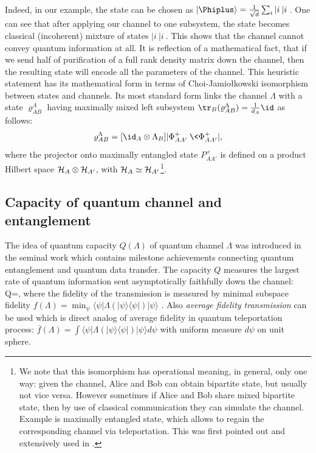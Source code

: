 \documentclass[twocolumn,aps,rmp]{revtex4}
\begin{document}
Indeed, in our example, the state can be chosen as
$|\Phiplus\rangle={1\over \sqrt{d}}\sum_i |i\>|i\>$. One can see
that after applying our channel to one subsystem, the state becomes
classical (incoherent) mixture of states $|i\>|i\>$. This shows that
the channel cannot convey quantum information at all. It is
reflection of a mathematical fact, that if we send half of
purification of a full rank density matrix down the channel, then
the resulting state will encode all the parameters of the channel.
This heuristic statement has its mathematical form in terms of
Choi-Jamio\l{}kowski isomorphism between states and channels. Its
most standard form links the channel $\Lambda$ with a state
$\varrho_{AB}^{\Lambda}$ having maximally mixed left subsystem
${\tr}_{B}(\varrho_{AB}^{\Lambda})={1\over d_A}\id$ as follows:
\begin{equation}
\varrho_{AB}^{\Lambda}=[\id_{A} \otimes \Lambda_{B}]|\Phi^+_{AA'}\> \<\Phi^+_{AA'}|,
\label{StatesChannelsIsomorphism}
\end{equation}
where the projector onto maximally entangled state $P^{+}_{AA'}$ is defined on a
product Hilbert space ${\cal H}_{A} \otimes {\cal H}_{A'}$, with
${\cal H}_{A}\simeq{\cal H}_{A'}$\footnote{We note that this isomorphism has operational meaning, in general, only one way: given the channel,
Alice and Bob can obtain bipartite state, but usually not vice versa.
However sometimes if Alice and Bob share  mixed bipartite state, then by use of classical communication they can simulate the channel. Example is
maximally entangled state, which allows to regain
the corresponding channel via teleportation. This was first pointed out
and extensively used in \cite{BDSW1996}.}.

\subsection{Capacity of quantum channel and entanglement}
The idea of quantum capacity $Q(\Lambda)$ of quantum channel
$\Lambda$ was introduced in the seminal work \cite{BDSW1996} which
contains milestone achievements connecting quantum entanglement and
quantum data transfer. The capacity $Q$ measures the largest rate of
quantum information sent asymptotically faithfully down the channel:
\be Q=, \ee where the  fidelity of  the transmission is
measured by minimal subspace fidelity $f(\Lambda) = \min_{\psi}
\langle \psi|\Lambda(|\psi \rangle \langle \psi|)|\psi \rangle $
\cite{BennettDS97-cap}. Also {\it average fidelity transmission} can
be used which is direct analog of average fidelity in quantum
teleportation process:
$\overline{f}(\Lambda) = \int \langle \psi|\Lambda(|\psi
\rangle \langle \psi|)|\psi \rangle d \psi$
with uniform measure $d \psi$ on unit sphere.
\end{document}
